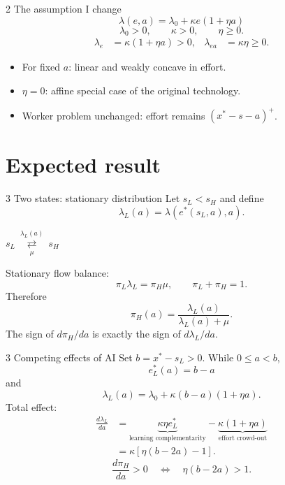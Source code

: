 \documentclass[aspectratio=169,11pt]{beamer}
\begin{document}
\begin{frame}{2 \textperiodcentered{} The assumption I change}
  \[
    \boxed{\lambda(e,a)=\lambda_0+\kappa e(1+\eta a)}
  \]
  \[
    \lambda_0>0,\qquad \kappa>0,\qquad \eta\geq0.
  \]
  \begin{align*}
    \lambda_e &= \kappa(1+\eta a)>0, &
    \lambda_{ea} &= \kappa\eta\geq0.
  \end{align*}
  \begin{itemize}
    \item For fixed $a$: linear and weakly concave in effort.
    \item $\eta=0$: affine special case of the original technology.
    \item Worker problem unchanged: effort remains $(x^*-s-a)^+$.
  \end{itemize}
\end{frame}

\section{Expected result}

\begin{frame}{3 \textperiodcentered{} Two states: stationary distribution}
  Let $s_L<s_H$ and define
  \[
    \lambda_L(a)=\lambda(e^*(s_L,a),a).
  \]
  \begin{center}
    $s_L\ \underset{\mu}{\overset{\lambda_L(a)}{\rightleftarrows}}\ s_H$
  \end{center}
  Stationary flow balance:
  \[
    \pi_L\lambda_L=\pi_H\mu,
    \qquad \pi_L+\pi_H=1.
  \]
  Therefore
  \[
    \boxed{\pi_H(a)=\frac{\lambda_L(a)}{\lambda_L(a)+\mu}.}
  \]
  \alert{The sign of $d\pi_H/da$ is exactly the sign of
  $d\lambda_L/da$.}
\end{frame}

\begin{frame}{3 \textperiodcentered{} Competing effects of AI}
  Set $b=x^*-s_L>0$. While $0\leq a<b$,
  \[
    e_L^*(a)=b-a
  \]
  and
  \[
    \lambda_L(a)
      =\lambda_0+\kappa(b-a)(1+\eta a).
  \]
  Total effect:
  \begin{align*}
    \frac{d\lambda_L}{da}
      &= \underbrace{\kappa\eta e_L^*}_{\text{learning complementarity}}
       - \underbrace{\kappa(1+\eta a)}_{\text{effort crowd-out}}\\[0.3em]
      &= \kappa[\eta(b-2a)-1].
  \end{align*}
  \[
    \boxed{\frac{d\pi_H}{da}>0
      \quad\Longleftrightarrow\quad \eta(b-2a)>1.}
  \]
\end{frame}
\end{document}
